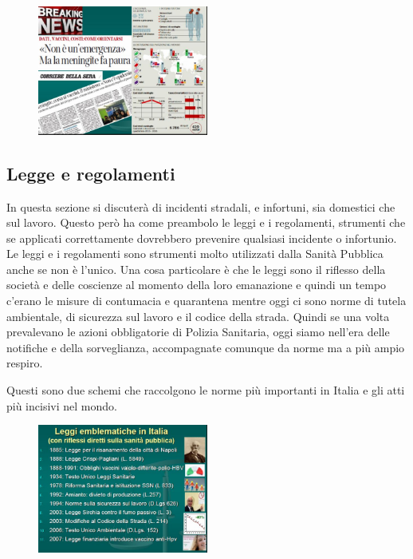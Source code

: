 \begin{figure}[!ht]
\centering
	\includegraphics[width=0.5\textwidth]{28/image1.jpg}
	\end{figure}

\subsection{Legge e regolamenti}

In questa sezione si discuterà di incidenti stradali, e infortuni, sia
domestici che sul lavoro. Questo però ha come preambolo le leggi e i
regolamenti, strumenti che se applicati correttamente dovrebbero
prevenire qualsiasi incidente o infortunio.
Le leggi e i regolamenti sono strumenti molto utilizzati dalla Sanità
Pubblica anche se non è l'unico. Una cosa particolare è che le leggi
sono il riflesso della società e delle coscienze al momento della loro
emanazione e quindi un tempo c'erano le misure di contumacia e
quarantena mentre oggi ci sono norme di tutela ambientale, di sicurezza
sul lavoro e il codice della strada. Quindi se una volta prevalevano le
azioni obbligatorie di Polizia Sanitaria, oggi siamo nell'era delle
notifiche e della sorveglianza, accompagnate comunque da norme ma a più
ampio respiro.

Questi sono due schemi che raccolgono le norme più importanti in Italia
e gli atti più incisivi nel mondo.

\begin{figure}[!ht]
\centering
	\includegraphics[width=0.5\textwidth]{28/image2.jpg}
	\end{figure}
	
